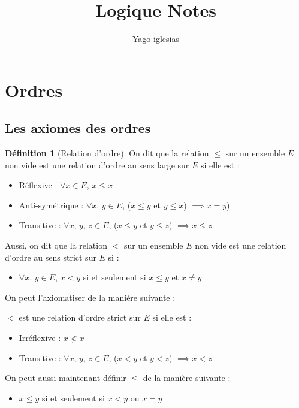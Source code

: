 \documentclass{article}
\theoremstyle{definition}
\newtheorem{definition}{Définition}
\theoremstyle{definition}
\theoremstyle{definition}
\theoremstyle{plain}
\theoremstyle{theorem}
\theoremstyle{theorem}
\begin{document}
\title{Logique Notes}
\author{Yago iglesias}
\maketitle
\tableofcontents


\section{Ordres}

\subsection{Les axiomes des ordres}


\begin{definition}[Relation d'ordre]

    On dit que la relation $\leqslant$ sur un ensemble $E$ non vide est une relation d'ordre au sens large sur $E$ si elle est :
    \begin{itemize}
        \item Réflexive : $\forall x \in E$, $x \leqslant x$
        \item Anti-symétrique : $\forall x$, $y \in E$, ($x \leqslant y$ et $y \leqslant x$) $\implies x = y$)
        \item Transitive : $\forall x$, $y$, $z \in E$, ($x \leqslant y$ et $y \leqslant z$) $\implies x \leqslant z$
    \end{itemize}
    
    Aussi, on dit que la relation $<$ sur un ensemble $E$ non vide est une relation d'ordre au sens strict sur $E$ si :
    \begin{itemize}
        \item $\forall x$, $y \in E$, $x < y$ si et seulement si $x \leqslant y$ et $x \ne y$
    \end{itemize}
    On peut l'axiomatiser de la manière suivante :

    $<$ est une relation d'ordre strict sur $E$ si elle est :
    \begin{itemize}
        \item Irréflexive : $x \nless x$
        \item Transitive : $\forall x$, $y$, $z \in E$, ($x < y$ et $y < z$) $\implies x < z$
    \end{itemize}
    On peut aussi maintenant définir $\leqslant$ de la manière suivante :
    \begin{itemize}
        \item $x \leq y$ si et seulement si  $x < y$ ou $x = y$
    \end{itemize}

\end{definition}
    
\end{document}
